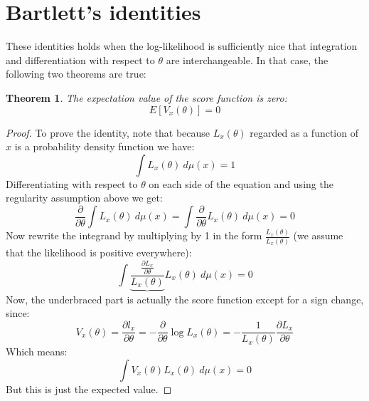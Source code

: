 \documentclass[12pt, a4paper]{article}
\newtheorem{theorem}{Theorem}[section]
\numberwithin{equation}{section}
\begin{document}
\section{Bartlett's identities}
These identities holds when the log-likelihood is sufficiently nice that integration and differentiation with respect to $\theta$ are interchangeable. In that case, the following two theorems are true:
\begin{theorem}
The expectation value of the score function is zero:
\begin{equation}
E[V_x(\theta)]=0
\end{equation}
\end{theorem}
\begin{proof}
To prove the identity, note that because $L_x(\theta)$ regarded as a function of $x$ is a probability density function we have:
\begin{equation}
\int L_x(\theta)\ d\mu(x)=1
\end{equation}
Differentiating with respect to $\theta$ on each side of the equation and using the regularity assumption above we get:
\begin{equation}
\frac{\partial}{\partial\theta}\int L_x(\theta)\ d\mu(x)=\int\frac{\partial}{\partial\theta}L_x(\theta)\ d\mu(x)=0
\end{equation}
Now rewrite the integrand by multiplying by 1 in the form $\frac{L_x(\theta)}{L_x(\theta)}$ (we assume that the likelihood is positive everywhere):
\begin{equation}
\int\underbrace{\frac{\frac{\partial L_x}{\partial\theta}}{L_x(\theta)}}L_x(\theta)\ d\mu(x)=0
\end{equation}
Now, the underbraced part is actually the score function except for a sign change, since:
\begin{equation}
V_x(\theta)=\frac{\partial l_x}{\partial\theta}=-\frac{\partial}{\partial\theta}\log L_x(\theta)=-\frac{1}{L_x(\theta)}\frac{\partial L_x}{\partial\theta}
\end{equation}
Which means:
\begin{equation}
\int V_x(\theta)L_x(\theta)\ d\mu(x)=0
\end{equation}
But this is just the expected value.
\end{proof}
\end{document}
